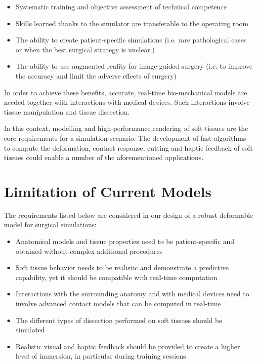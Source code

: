 \begin{itemize}
 \item Systematic training and objective assessment of technical competence
 \item Skills learned thanks to the simulator are transferable to the operating room
 \item The ability to create patient-specific simulations (i.e. rare pathological cases or when the best 
 surgical strategy is unclear.)
 \item The ability to use augmented reality for image-guided surgery (i.e. to improve the accuracy and 
 limit the adverse effects of surgery)
\end{itemize}

In order to achieve these benefits, accurate, real-time bio-mechanical models are needed together
with interactions with medical devices. Such interactions involve tissue manipulation and tissue dissection. 

In this context, modelling and high-performance rendering of soft-tissues are the core requirements for 
a simulation scenario. The development of fast algorithms to compute the deformation, contact response, 
cutting and haptic feedback of soft tissues could enable a number of the aforementioned applications.


\section{Limitation of Current Models}
\label{sec:limitationsOfCurrentModels}

The requirements listed below are considered in our design of a robust deformable 
model for surgical simulations:

\begin{itemize}
  \item Anatomical models and tissue properties need to be patient-specific and 
obtained without complex additional procedures
  \item Soft tissue behavior needs to be realistic and demonstrate a predictive capability, yet it should be 
  compatible with real-time computation
  \item Interactions with the surrounding anatomy and with medical devices need to involve advanced 
  contact models that can be computed in real-time
  \item The different types of dissection performed on soft tissues should be simulated
  \item Realistic visual and haptic feedback should be provided to create a higher level of immersion, in 
  particular during training sessions
\end{itemize}

